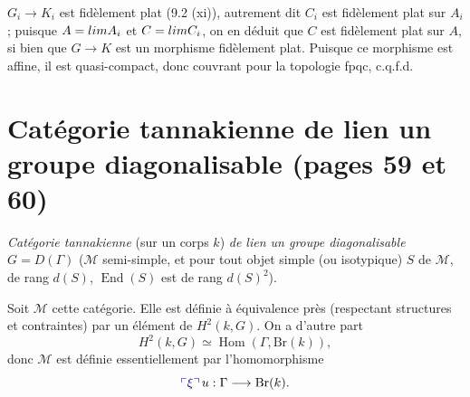 \documentclass[11pt,a4paper]{article}
\begin{document}
$G_{i} \longrightarrow K_{i}$ est fidèlement plat (9.2 (xi)), autrement dit
$C_{i}$ est fidèlement plat sur $A_{i}$ ; puisque
$A = \varinjlim A_{i}$ et $C = \varinjlim C_{i}$, on en déduit que $C$ est
fidèlement plat sur $A$,  si bien
que $G \longrightarrow K$ est un morphisme fidèlement plat. Puisque ce
morphisme est affine, il est quasi-compact, donc couvrant pour la topologie
fpqc, c.q.f.d.


\section*{Catégorie tannakienne de lien un groupe diagonalisable (pages 59
et 60)}


\emph{Catégorie tannakienne} (sur un corps $k$) \emph{de \struck{\ill{}} lien un groupe diagonalisable} $G = D(\Gamma)$
\add{$\Longleftarrow$} ($\mathcal{M}$ semi-simple, et pour tout objet
simple (ou isotypique) $S$ de $\mathcal{M}$, de rang $d(S)$,
$\operatorname{End}(S)$ est de rang $d(S)^{2}$).

Soit $\mathcal{M}$ cette catégorie. Elle est définie à équivalence près
(respectant structures et contraintes) par un élément \add{$\xi$} de
$H^{2}(k, G)$. On a d'autre part
\[
H^{2}(k, G) \simeq \operatorname{Hom}(\Gamma, \mathrm{Br}(k)) ,
\]
donc $\mathcal{M}$ est définie essentiellement par l'homomorphisme
\struck{\ill{}}
\[
\add{\xi}\, u : \Gamma \longrightarrow \mathrm{Br}(k) .
\]
\end{document}
